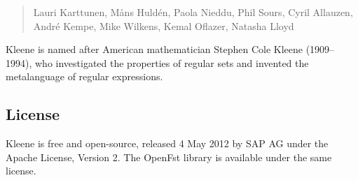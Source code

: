 \documentclass[letterpaper,12pt]{book}
\providecommand{\init}{}\renewcommand{\init}{\MakeUppercase}
\begin{document}
\begin{quote}
Lauri Karttunen, M\r{a}ns Huld\'en, Paola Nieddu, Phil Sours, Cyril
Allauzen, André Kempe, 
Mike Wilkens,
Kemal Oflazer, Natasha Lloyd
\end{quote}

\noindent
Kleene is named after American mathematician Stephen Cole Kleene
(1909--1994), who investigated the properties of regular sets and invented
the metalanguage of regular expressions.

\subsection*{License}

Kleene is free and open-source, released 4 May 2012  by \init{sap ag} under the Apache License, Version
2.  The OpenFst library is available
under the same license.

\nocite{hulden:2009thesis}
\nocite{allauzen+riley+schalkwyk+skut+mohri:2007}


\tableofcontents
% 


\mainmatter






\appendix




\backmatter

%



\end{document}
